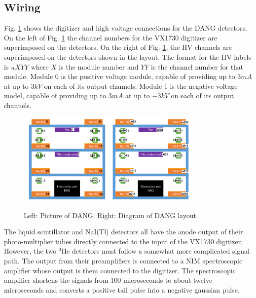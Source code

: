 \documentclass[onecolumn, 10pt, letterpaper, twoside]{article}
\newcommand{\nuc}[2] {$^{#1}$#2}
\begin{document}
\subsection{Wiring}
Fig. \ref{fig:DANG-Wiring} shows the digitizer and high voltage connections for the DANG detectors. On the left of Fig. \ref{fig:DANG-Wiring} the channel numbers for the VX1730 digitizer are superimposed on the detectors. On the right of Fig. \ref{fig:DANG-Wiring}, the HV channels are superimposed on the detectors shown in the layout. The format for the HV labels is $uXYY$ where $X$ is the module number and $YY$ is the channel number for that module. Module $0$ is the positive voltage module, capable of providing up to $3mA$ at up to $3kV$ on each of its output channels. Module $1$ is the negative voltage model, capable of providing up to $3mA$ at up to $-3kV$ on each of its output channels.

\begin{figure}[h!]
\begin{center}
\includegraphics[width=0.4\textwidth]{./img/DANG_Layout_Digi_Chans.png}\includegraphics[width=0.4\textwidth]{./img/DANG_Layout_HV_chans.png}
\caption{Left: Picture of DANG. Right: Diagram of DANG layout}
\label{fig:DANG-Wiring}
\end{center}
\end{figure}

The liquid scintillator and NaI(Tl) detectors all have the anode output of their photo-multiplier tubes directly connected to the input of the VX1730 digitizer. However, the two \nuc{3}{He} detectors must follow a somewhat more complicated signal path. The output from their preamplifiers is connected to a NIM spectroscopic amplifier whose output is them connected to the digitizer. The spectroscopic amplifier shortens the signals from 100 microseconds to about twelve microseconds and converts a positive tail pulse into a negative gaussian pulse.
\end{document}

